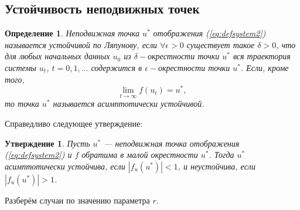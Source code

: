 \documentclass[12pt]{article}
\newtheorem{statement}{Утверждение}
\newtheorem{definition}{Определение}
\begin{document}
\subsection{Устойчивость неподвижных точек}
\begin{definition}
    Неподвижная точка $u^*$ отображения (\ref{eq:defsystem2}) называется \textit{устойчивой по Ляпунову}, если $\forall \epsilon > 0$ существует такое $\delta > 0$, что для любых начальных данных $u_0$ из $\delta-$окрестности точки $u^*$ вся траектория системы $u_t$, $t = 0, 1, ...$ содержится в $\epsilon-$окрестности точки $u^*$. Если, кроме того, \[\lim_{t \rightarrow \infty} f(u_t) = u^*,\] то точка $u^*$ называется \textit{асимптотически устойчивой}.  
\end{definition}
Справедливо следующее утверждение:
\begin{statement}
    Пусть $u^*$ — неподвижная точка отображения (\ref{eq:defsystem2}) и $f$ обратима в малой окрестности $u^*$. Тогда $u^*$ асимптотически устойчива, если $|f_u(u^*)| < 1$, и неустойчива, если $|f_u(u^*)| > 1$. \label{st1}
\end{statement}
Разберём случаи по значению параметра $r$.
\end{document}
